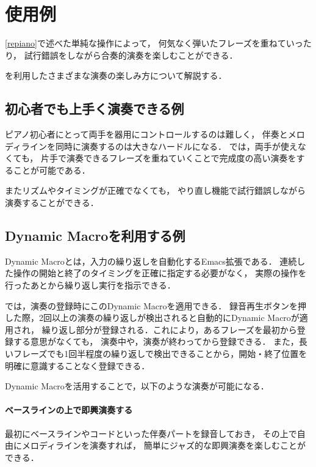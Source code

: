 \section{{\system}使用例}

\ref{repiano}で述べた単純な操作によって，
何気なく弾いたフレーズを重ねていったり，
試行錯誤をしながら合奏的演奏を楽しむことができる．

{\system}を利用したさまざまな演奏の楽しみ方について解説する．

\subsection{初心者でも上手く演奏できる例}
ピアノ初心者にとって両手を器用にコントロールするのは難しく，
伴奏とメロディラインを同時に演奏するのは大きなハードルになる．
{\system}では，両手が使えなくても，
片手で演奏できるフレーズを重ねていくことで完成度の高い演奏をすることが可能である．

またリズムやタイミングが正確でなくても，
やり直し機能で試行錯誤しながら演奏することができる．


\subsection{Dynamic Macroを利用する例}
Dynamic Macroとは，入力の繰り返しを自動化するEmacs拡張である．
連続した操作の開始と終了のタイミングを正確に指定する必要がなく，
実際の操作を行ったあとから繰り返し実行を指示できる．

{\system}では，演奏の登録時にこのDynamic Macroを適用できる．
録音再生ボタンを押した際，2回以上の演奏の繰り返しが検出されると自動的にDynamic Macroが適用され，
繰り返し部分が登録される．これにより，あるフレーズを最初から登録する意思がなくても，
演奏中や，演奏が終わってから登録できる．
また，長いフレーズでも1回半程度の繰り返しで検出できることから，開始・終了位置を明確に意識することなく登録できる．

Dynamic Macroを活用することで，以下のような演奏が可能になる．

\paragraph*{ベースラインの上で即興演奏する}
最初にベースラインやコードといった伴奏パートを録音しておき，
その上で自由にメロディラインを演奏すれば，
簡単にジャズ的な即興演奏を楽しむことができる．

